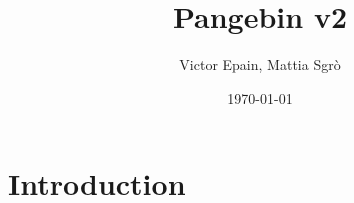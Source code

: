 \documentclass{article}
\title{Pangebin v2}
\author{Victor Epain, Mattia Sgr\`o}
\date{\today}
\begin{document}
\maketitle

\tableofcontents%

\section{Introduction}







\printbibliography%

\clearpage%

\appendix%


\end{document}
